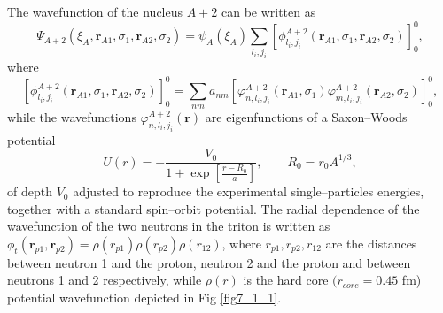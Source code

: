 The wavefunction of the nucleus $A+2$ can be written as 
\begin{equation}\label{eq7_1_1}
\Psi_{A+2}(\xi_A,\mathbf r_{A1},\sigma_1,\mathbf r_{A2},\sigma_2)=\psi_A(\xi_A)\sum_{l_i,j_i}[\phi^{A+2}_{l_i,j_i}(\mathbf r_{A1},\sigma_1,\mathbf r_{A2},\sigma_2)]^0_0,
\end{equation} 
where 
\begin{equation}\label{eq7_1_2}
[\phi^{A+2}_{l_i,j_i}(\mathbf r_{A1},\sigma_1,\mathbf r_{A2},\sigma_2)]^0_0=\sum_{nm}a_{nm}\left[\varphi^{A+2}_{n,l_i,j_i}(\mathbf r_{A1},\sigma_1)\varphi^{A+2}_{m,l_i,j_i}(\mathbf r_{A2},\sigma_2)\right]^0_0,
\end{equation} 
while the wavefunctions $\varphi^{A+2}_{n,l_i,j_i}(\mathbf r)$ are eigenfunctions of a Saxon--Woods potential
\begin{equation}\label{Eq17}
U(r)=-\frac{V_0}
{1+\exp\left[\frac{r-R_0}{a}\right]},\quad\quad R_0=r_0 A^{1/3},
\end{equation}
of depth $V_0$  adjusted to reproduce the experimental single--particles energies, together with a standard spin--orbit potential.
 The radial dependence of the  wavefunction of the two neutrons in the triton is written as $\phi_t(\mathbf r_{p1},\mathbf r_{p2})=\rho(r_{p1})\rho(r_{p2})\rho(r_{12})$, where $r_{p1},r_{p2},r_{12}$ are the distances between neutron 1 and the proton, neutron 2 and the proton and between neutrons 1 and 2 respectively, while $\rho(r)$ is the hard core $(r_{core}=0.45$ fm) potential  wavefunction  depicted in Fig \ref{fig7_1_1}.
 
